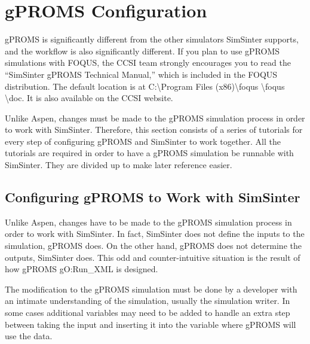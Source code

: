 \section{gPROMS Configuration}
\label{sec.tut.simsinter.gproms}

gPROMS is significantly different from the other simulators SimSinter
supports, and the workflow is also significantly different.  If you
plan to use gPROMS simulations with FOQUS, the CCSI team strongly
encourages you to read the ``SimSinter gPROMS Technical Manual,''
which is included in the FOQUS distribution.  The default location is
at C:\textbackslash Program Files (x86)\textbackslash foqus
\textbackslash foqus \textbackslash doc.  It is also available on the CCSI website.

Unlike Aspen, changes must be made to the gPROMS simulation process in
order to work with SimSinter.  Therefore, this section consists of a
series of tutorials for every step of configuring gPROMS and SimSinter
to work together.  All the tutorials are required in order to have a
gPROMS simulation be runnable with SimSinter. They are divided up to
make later reference easier.

\subsection{Configuring gPROMS to Work with SimSinter} \label{gPROMSConfigSubSection}

Unlike Aspen, changes have to be made to the gPROMS simulation process in order to work with SimSinter.  In fact, SimSinter does not define the inputs to the simulation, gPROMS does.  On the other hand, gPROMS does not determine the outputs, SimSinter does. This odd and counter-intuitive situation is the result of how gPROMS gO:Run\_XML is designed.

The modification to the gPROMS simulation must be done by a developer with an intimate understanding of the simulation, usually the simulation writer.  In some cases additional variables may need to be added to handle an extra step between taking the input and inserting it into the variable where gPROMS will use the data.

